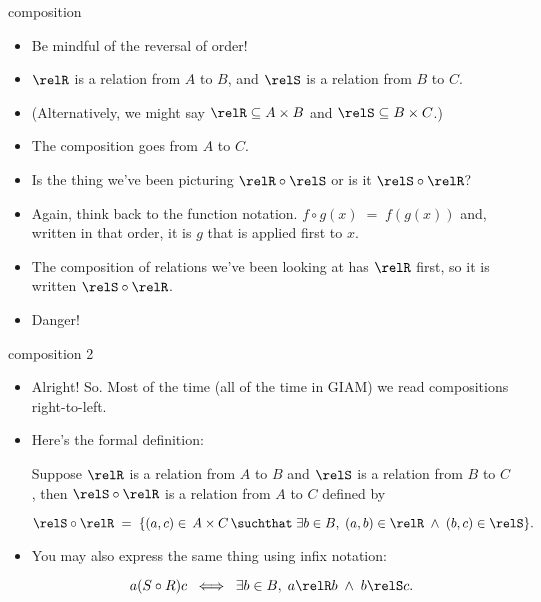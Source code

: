 \documentclass[handout,landscape]{beamer}
\begin{document}
\begin{frame}{composition}
\begin{itemize}
\item Be mindful of the reversal of order!\pause
\item $\relR$ is a relation from $A$ to $B$, and $\relS$ is a relation from $B$ to $C$. \pause
\item (Alternatively, we might say $\relR \subseteq A \times B$ and $\relS \subseteq B \times C$.) \pause
\item The composition goes from $A$ to $C$. \pause
\item Is the thing we've been picturing $\relR \circ \relS$ or is it $\relS \circ \relR$? \pause
\item Again, think back to the function notation. \pause \newline
$f \circ g (x) \; = \; f(g(x))$ and, written in that order, it is $g$ that is applied first to $x$. \pause
\item The composition of relations we've been looking at has $\relR$ first, so it is written $\relS \circ \relR$. \pause
\item Danger!
\end{itemize}
\end{frame}

\begin{frame}{composition 2}
\begin{itemize}
\item Alright! So. Most of the time (all of the time in GIAM) we read compositions right-to-left.\pause
\item Here's the formal definition: \pause

Suppose $\relR$ is a relation from $A$ to $B$ and $\relS$ is a relation from $B$ to $C$, then $\relS \circ \relR$ is a relation from $A$ to $C$ defined by \pause

\[ \relS \circ \relR \; = \; \{ (a,c) \in \, A \times C \, \suchthat \; \exists b \in B, \; (a,b) \in \relR \; \land \; (b,c) \in \relS \}. \]
\pause

\item You may also express the same thing using infix notation: \pause

\[ a(S\circ R)c \; \iff \; \exists b \in B, \; a\relR b \; \land \; b\relS c.\]

\end{itemize}
\end{frame}
\end{document}

